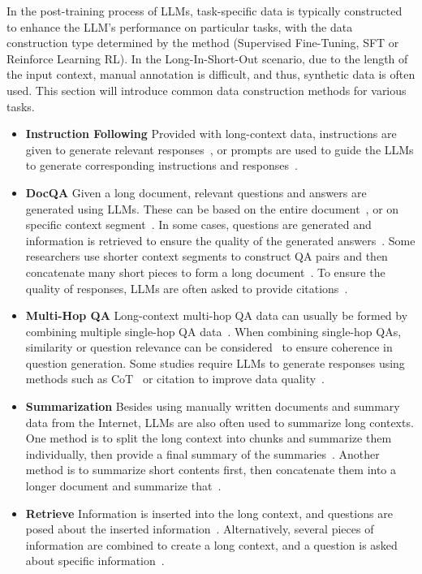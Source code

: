 In the post-training process of LLMs, task-specific data is typically constructed to enhance the LLM’s performance on particular tasks, with the data construction type determined by the method (Supervised Fine-Tuning, SFT or Reinforce Learning RL). In the Long-In-Short-Out scenario, due to the length of the input context, manual annotation is difficult, and thus, synthetic data is often used. This section will introduce common data construction methods for various tasks.
\begin{itemize}
    \item{\textbf{Instruction Following}}
Provided with long-context data, instructions are given to generate relevant responses~\citep{chenlonglora}, or prompts are used to guide the LLMs to generate corresponding instructions and responses~\citep{koksal2023longform, bai2024longalign}.
    \item{\textbf{DocQA}}
Given a long document, relevant questions and answers are generated using LLMs. These can be based on the entire document~\citep{kaili2024mdcure}, or on specific context segment~\citep{an2024make, xiong2024effective, dubey2024llama}. In some cases, questions are generated and information is retrieved to ensure the quality of the generated answers~\citep{anonymous2024longpo, yu2023training}. Some researchers use shorter context segments to construct QA pairs and then concatenate many short pieces to form a long document~\citep{li2024longsyntheticdata, young2024yi}. To ensure the quality of responses, LLMs are often asked to provide citations~\citep{zhang2024longcite}.
    \item{\textbf{Multi-Hop QA}}
Long-context multi-hop QA data can usually be formed by combining multiple single-hop QA data~\citep{trivedi2022musique}. When combining single-hop QAs, similarity or question relevance can be considered~\citep{chen2024essential} to ensure coherence in question generation. Some studies require LLMs to generate responses using methods such as CoT~\citep{wei2022chain} or citation to improve data quality~\citep{li2024making}.
    \item{\textbf{Summarization}}
Besides using manually written documents and summary data from the Internet, LLMs are also often used to summarize long contexts. One method is to split the long context into chunks and summarize them individually, then provide a final summary of the summaries~\citep{dubey2024llama, chatglm2024glmlong}. Another method is to summarize short contents first, then concatenate them into a longer document and summarize that~\citep{li2024longsyntheticdata}.
    \item{\textbf{Retrieve}}
Information is inserted into the long context, and questions are posed about the inserted information~\citep{niah}. Alternatively, several pieces of information are combined to create a long context, and a question is asked about specific information~\citep{xiong2024artificialneedlesrealhaystacks}.
\end{itemize}


